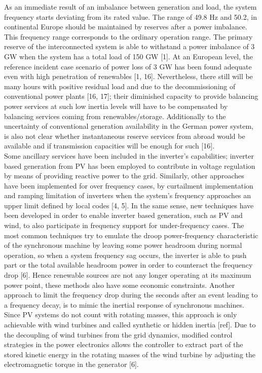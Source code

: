   As an immediate result of an imbalance between generation and load, the system frequency starts deviating from its rated value. The range of 49.8 Hz and 50.2, in continental Europe should be maintained by reserves after a power imbalance. This frequency range corresponds to the ordinary operation range. The primary reserve of the interconnected system is able to withstand a power imbalance of 3 GW when the system has a total load of 150 GW [1].
  At an European level, the reference incident case scenario of power loss of 3 GW has been found adequate even with high penetration of renewables [1, 16]. Nevertheless, there still will be  many hours with positive residual load and due to the decommissioning of conventional power plants [16, 17]; their diminished capacity to provide balancing power services at such low inertia levels will have to be compensated by balancing services coming from renewables/storage. Additionally to the uncertainty of conventional generation availability in the German power system, is also not clear whether instantaneous reserve services from abroad would be available and if transmission capacities will be enough for such [16].\\  
 
 Some ancillary services have been included in the inverter’s capabilities; inverter based generation from PV has been employed to contribute in voltage regulation by means of providing reactive power to the grid. Similarly, other approaches have been implemented for over frequency cases, by curtailment implementation and ramping limitation of inverters when the system's frequency approaches an upper limit defined by local codes [4, 5]. In the same sense, new techniques have been developed in order to enable inverter based generation, such as PV and wind, to also participate in frequency support for under-frequency cases. The most common techniques try to emulate the droop power-frequency characteristic of the synchronous machine by leaving some power headroom during normal operation, so when a system frequency sag occurs, the inverter is able to push part or the total available headroom power in order to counteract the frequency drop [6]. Hence renewable sources are not any longer operating at its maximum power point, these methods also have some economic constraints. Another approach to limit the frequency drop during the seconds after an event leading to a frequency decay, is to mimic the inertial response of synchronous machines. Since PV systems do not count with rotating masses, this approach is only achievable with wind turbines and called synthetic or hidden inertia [ref]. Due to the decoupling of wind turbines from the grid dynamics, modified control strategies in the power electronics allows the controller to extract part of the stored kinetic energy in the rotating masses of the wind turbine by adjusting the electromagnetic torque in the generator [6]. \\
 
